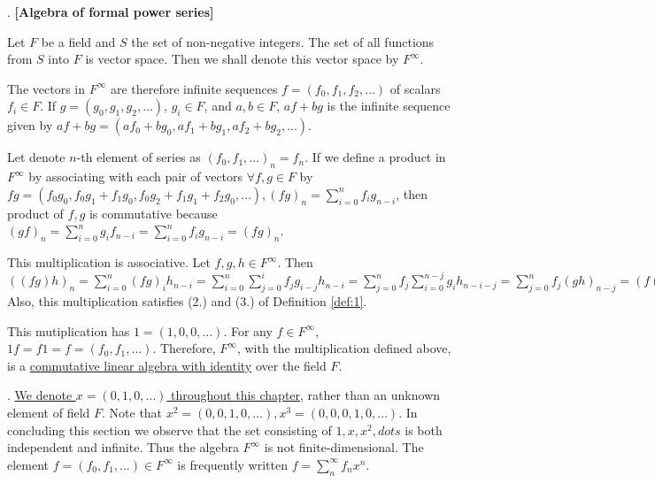 \documentclass[8pt]{beamer}
\newcommand{\tb}[1]{\textbf{#1}}
\begin{document}
\begin{frame}{.}
    \tb{[Algebra of formal power series]}

    Let $F$ be a field and $S$ the set of non-negative integers.
    The set of all functions from $S$ into $F$ is vector space.
    Then we shall denote this vector space by $F^\infty$.

    \smallskip
    The vectors in $F^\infty$ are therefore infinite sequences $f=(f_0, f_1, f_2, \dots)$ of scalars $f_i \in F$.
    If $g = (g_0, g_1, g_2, \dots)$, $g_i \in F$, and $a,b \in F$,
    $af+bg$ is the infinite sequence given by $af+bg = (af_0 + bg_0 , a f_1 + bg_1, a f_2 + b g_2, \dots)$.

    \smallskip
    Let denote $n$-th element of series as $(f_0, f_1, \dots)_n = f_n$.
    If we define a product in $F^\infty$ by associating with each pair of vectors $\forall f, g \in F$ by $fg = (f_0 g_0, f_0 g_1 + f_1 g_0, f_0 g_2 + f_1 g_1 + f_2 g_0, \dots), (fg)_n = \sum_{i=0}^n f_i g_{n-i}$, then product of $f, g$ is commutative because $(gf)_n = \sum_{i=0}^n g_i f_{n-i} = \sum_{i=0}^n f_i g_{n-i} = (fg)_n$.

    \smallskip
    This multiplication is associative.
    Let $f, g, h \in F^\infty$.
    Then $((fg)h)_n = \sum_{i=0}^n (fg)_i h_{n-i} = \sum_{i=0}^n \sum_{j=0}^i f_j g_{i-j} h_{n-i} = \sum_{j=0}^n f_j \sum_{i=0}^{n-j} g_i h_{n-i-j} = \sum_{j=0}^n f_j (gh)_{n-j} = (f(gh))_n$
    Also, this multiplication satisfies (2.) and (3.) of Definition \ref{def:1}.
    
    \smallskip
    This mutiplication has $1 = (1, 0, 0, \dots)$.
    For any $f \in F^\infty$, $1f = f1 = f = (f_0, f_1, \dots)$.
    Therefore, $F^\infty$, with the multiplication defined above, is a \underline{commutative linear algebra with identity} over the field $F$.
\end{frame}

\begin{frame}{.}
    \underline{We denote $x = (0, 1, 0, \dots)$ throughout this chapter}, rather than an unknown element of field $F$.
    Note that $x^2 = (0, 0, 1, 0, \dots), x^3 = (0, 0, 0, 1, 0, \dots)$.
    In concluding this section we observe that the set consisting of $1, x, x^2, dots$ is both independent and infinite.
    Thus the algebra $F^\infty$ is not finite-dimensional.
    The element $f=(f_0, f_1, \dots) \in F^\infty$ is frequently written $f = \sum_n^\infty f_n x^n$.

\end{frame}
\end{document}

